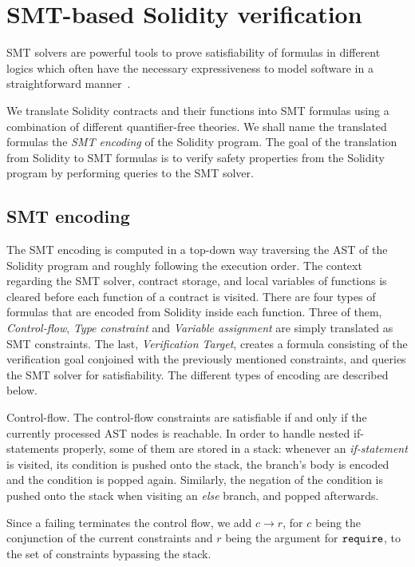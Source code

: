 \section{SMT-based Solidity verification}
\label{section:smt}

SMT solvers are powerful tools to prove satisfiability of formulas in different
logics which often have the necessary expressiveness to model software in a
straightforward manner~\cite{Komuravelli13,Alt17,Donaldson11,Beyer11}.

We translate Solidity contracts and their functions into SMT formulas using a
combination of different quantifier-free theories.
%
We shall name the translated formulas the \emph{SMT encoding} of the Solidity
program.
%
The goal of the translation from Solidity to SMT formulas is to verify safety
properties from the Solidity program by performing queries to the SMT solver.

\subsection{SMT encoding}

The SMT encoding is computed in a top-down way traversing the AST of the
Solidity program and roughly following the execution order.
%
The context regarding the SMT solver, contract storage, and local variables of
functions is cleared before each function of a contract is visited.
%
There are four types of formulas that are encoded from Solidity inside each function.
%
Three of them, \emph{Control-flow}, \emph{Type constraint} and \emph{Variable assignment}
are simply translated as SMT constraints.
%
The last, \emph{Verification Target}, creates a formula consisting of the
verification goal conjoined with the previously mentioned constraints, and
queries the SMT solver for satisfiability.
%
The different types of encoding are described below.

\begin{paragraph}{Control-flow.}
The control-flow constraints are satisfiable if and only if the currently
processed AST nodes is reachable. In order to handle nested if-statements
properly, some of them are stored in a stack:
whenever an \emph{if-statement} is visited,
its condition is pushed onto the stack, the branch's body is encoded and the
condition is popped again.
%
Similarly, the negation of the condition is pushed onto the stack when visiting
an \emph{else} branch, and popped afterwards.

Since a failing  terminates the control flow,
we add $c \to r$,
for $c$ being the conjunction of the current constraints and $r$ being
the argument for $\texttt{require}$, to the set of constraints bypassing the stack.
\end{paragraph}

